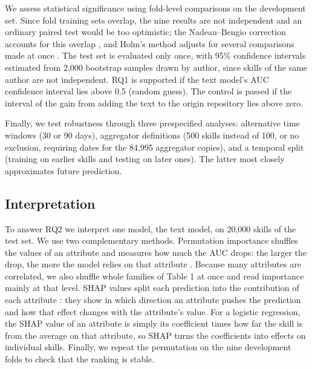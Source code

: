 We assess statistical significance using fold-level comparisons on the
development set. Since fold training sets overlap, the nine results are
not independent and an ordinary paired test would be too optimistic; the
Nadeau--Bengio correction accounts for this overlap
\cite{nadeau2003inference}, and Holm's method adjusts for several
comparisons made at once \cite{holm1979simple}. The test set is
evaluated only once, with 95\% confidence intervals estimated from 2,000
bootstrap samples drawn by author, since skills of the same author are
not independent. RQ1 is supported if the text model's AUC confidence
interval lies above 0.5 (random guess). The control is passed if the
interval of the gain from adding the text to the origin repository lies
above zero.

Finally, we test robustness through three prespecified analyses:
alternative time windows (30 or 90 days), aggregator definitions (500
skills instead of 100, or no exclusion, requiring dates for the 84,995
aggregator copies), and a temporal split (training on earlier skills and
testing on later ones). The latter most closely approximates future
prediction.

\subsection{Interpretation}\label{interpretation}

To answer RQ2 we interpret one model, the text model, on 20,000 skills
of the test set. We use two complementary methods. Permutation
importance shuffles the values of an attribute and measures how much the
AUC drops: the larger the drop, the more the model relies on that
attribute \cite{breiman2001statistical,molnar2020interpretable}. Because
many attributes are correlated, we also shuffle whole families of Table
1 at once and read importance mainly at that level. SHAP values split
each prediction into the contribution of each attribute
\cite{lundberg2017unified}: they show in which direction an attribute
pushes the prediction and how that effect changes with the attribute's
value. For a logistic regression, the SHAP value of an attribute is
simply its coefficient times how far the skill is from the average on
that attribute, so SHAP turns the coefficients into effects on
individual skills. Finally, we repeat the permutation on the nine
development folds to check that the ranking is stable.

